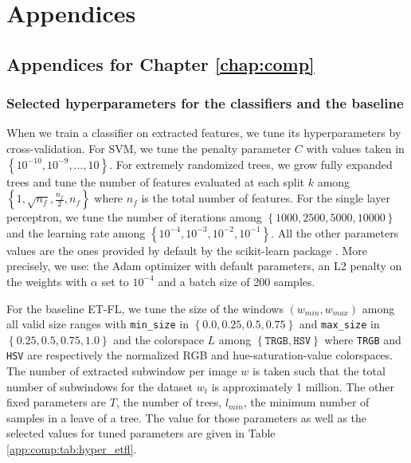 \part{Appendices}

\chapter{Appendices for Chapter \ref{chap:comp}}
\label{app:comp}

\section{Selected hyperparameters for the classifiers and the baseline}
\label{app:comp:sec:selectedhyperparameters}

When we train a classifier on extracted features, we tune its hyperparameters by cross-validation. For SVM, we tune the penalty parameter $C$ with values taken in 
$\left\{10^{-10}, 10^{-9},...,10\right\}$. For extremely randomized trees, we grow fully expanded trees and tune the number of features evaluated at each split $k$ among $\left\{1, \sqrt{n_f}, \frac{n_f}{2}, n_f\right\}$ where 
$n_f$ is the total number of features. For the single layer perceptron, we tune the number of iterations among $\left\{1000, 2500, 5000, 10000\right\}$ and the learning rate among $\left\{10^{-4}, 10^{-3}, 10^{-2}, 10^{-1}\right\}$. All the other parameters values are the ones provided by default by the scikit-learn package \parencite{scikit-learn}. More precisely, we use: the Adam \parencite{kingma2014adam} optimizer with default parameters, an L2 penalty on the weights with $\alpha$ set to $10^{-4}$ and a batch size of 200 samples.

For the baseline ET-FL, we tune the size of the windows $\left(w_{min}, w_{max}\right)$ among all valid size ranges with \texttt{min\_size} in $\left\{0.0, 0.25, 0.5, 0.75\right\}$ and \texttt{max\_size} in $\left\{0.25, 0.5, 0.75, 1.0\right\}$ and the colorspace $L$ among $\left\{\texttt{TRGB}, \texttt{HSV}\right\}$ where \texttt{TRGB} and \texttt{HSV} are respectively the normalized RGB and hue-saturation-value colorspaces. The number of extracted subwindow per image $w$ is taken such that the total number of subwindows for the dataset $w_t$ is approximately 1 million. The other fixed parameters are $T$, the number of trees, $l_{min}$, the minimum number of samples in a leave of a tree. The value for those parameters as well as the selected values for tuned parameters are given in Table \ref{app:comp:tab:hyper_etfl}. 

